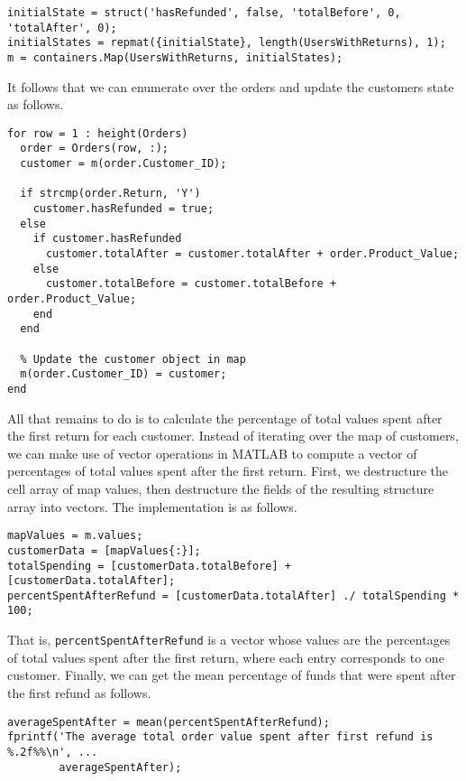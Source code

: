 \begin{lstlisting}
initialState = struct('hasRefunded', false, 'totalBefore', 0, 'totalAfter', 0);
initialStates = repmat({initialState}, length(UsersWithReturns), 1);
m = containers.Map(UsersWithReturns, initialStates);
\end{lstlisting}

\noindent
It follows that we can enumerate over the orders and update the customers state as follows.

\begin{lstlisting}
for row = 1 : height(Orders)
  order = Orders(row, :);
  customer = m(order.Customer_ID);

  if strcmp(order.Return, 'Y')
    customer.hasRefunded = true;
  else
    if customer.hasRefunded
      customer.totalAfter = customer.totalAfter + order.Product_Value;
    else
      customer.totalBefore = customer.totalBefore + order.Product_Value;
    end
  end
  
  % Update the customer object in map
  m(order.Customer_ID) = customer;     
end
\end{lstlisting}

\noindent
All that remains to do is to calculate the percentage of total values spent after the first return for each customer. Instead of iterating over the map of customers, we can make use of vector operations in MATLAB to compute a vector of percentages of total values spent after the first return. First, we destructure the cell array of map values, then destructure the fields of the resulting structure array into vectors. The implementation is as follows.

\begin{lstlisting}
mapValues = m.values;
customerData = [mapValues{:}];
totalSpending = [customerData.totalBefore] + [customerData.totalAfter];
percentSpentAfterRefund = [customerData.totalAfter] ./ totalSpending * 100;
\end{lstlisting}

\noindent
That is, \lstinline|percentSpentAfterRefund| is a vector whose values are the percentages of total values spent after the first return, where each entry corresponds to one customer. Finally, we can get the mean percentage of funds that were spent after the first refund as follows.

\begin{lstlisting}
averageSpentAfter = mean(percentSpentAfterRefund);
fprintf('The average total order value spent after first refund is %.2f%%\n', ...
        averageSpentAfter);
\end{lstlisting}

